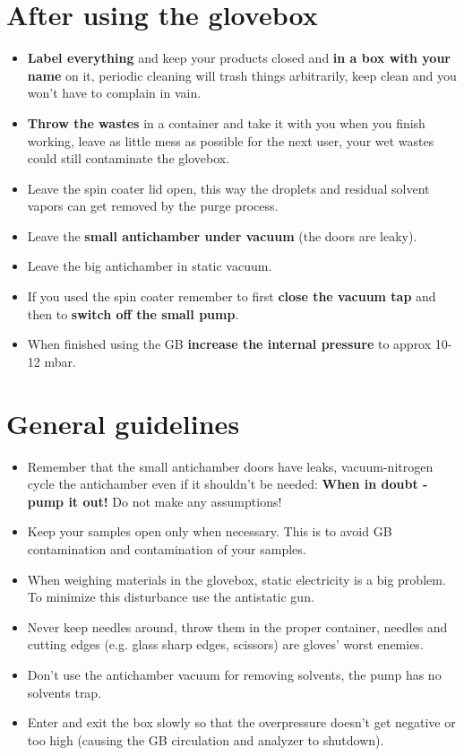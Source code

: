 \documentclass[a4paper,15pt]{scrartcl}
\begin{document}
\section*{After using the glovebox}
\begin{itemize}
	\item     \textbf{Label everything} and keep your products closed and \textbf{in a box with your name} on it, periodic cleaning will trash things arbitrarily, keep clean and you won't have to complain in vain.
	\item     \textbf{Throw the wastes} in a container and take it with you when you finish working, leave as little mess as possible for the next user, your wet wastes could still contaminate the glovebox.
	\item     Leave the spin coater lid open, this way the droplets and residual solvent vapors can get removed by the purge process.
	\item     Leave the \textbf{small antichamber under vacuum} (the doors are leaky).
	\item     Leave the big antichamber in static vacuum.
	\item     If you used the spin coater remember to first \textbf{close the vacuum tap} and then to \textbf{switch off the small pump}.
	\item    When finished using the GB \textbf{increase the internal pressure} to approx 10-12 mbar.
\end{itemize}


\section*{General guidelines}
\begin{itemize}
	\item     Remember that the small antichamber doors have leaks, vacuum-nitrogen cycle the antichamber even if it shouldn't be needed: \textbf{When in doubt - pump it out!} Do not make any assumptions!
	\item     Keep your samples open only when necessary. This is to avoid GB contamination and contamination of your samples.
	\item     When weighing materials in the glovebox, static electricity is a big problem. To minimize this disturbance use the antistatic gun.
	\item     Never keep needles around, throw them in the proper container, needles and cutting edges (e.g. glass sharp edges, scissors) are gloves' worst enemies.
	\item     Don't use the antichamber vacuum for removing solvents, the pump has no solvents trap.
	\item     Enter and exit the box slowly so that the overpressure doesn't get negative or too high (causing the GB circulation and analyzer to shutdown).
\end{itemize}
\end{document}
